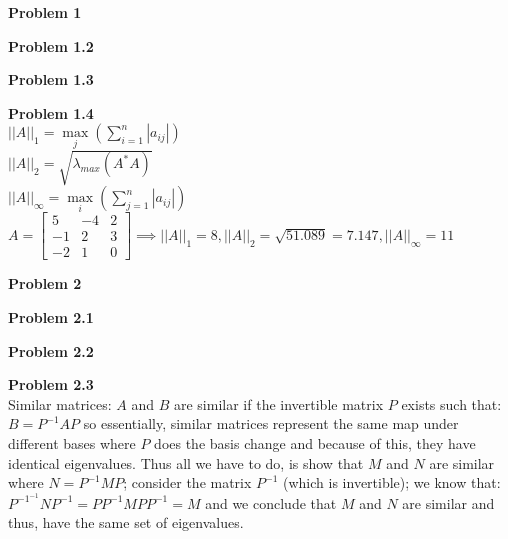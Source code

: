 \documentclass{article}
\newenvironment{problem}[2][Problem]
    { \begin{mdframed}[backgroundcolor=gray!20] \textbf{#1 #2} \\}
    {  \end{mdframed}}
\begin{document}
\begin{problem}{1}
\begin{problem}{1.2}
\begin{section}{}
            \end{section}

        \end{problem}

        \begin{problem}{1.3}
            
        \end{problem}

        \begin{problem}{1.4}
            $||A||_1 = \underset{j}{\max}(\displaystyle\sum_{i=1}^n|a_{ij}|)$\\
            $||A||_2 = \sqrt{\lambda_{max}(A^*A)}$\\
            $||A||_\infty = \underset{i}{\max}(\displaystyle\sum_{j=1}^n|a_{ij}|)$\\
            $A = \begin{bmatrix} 5&-4&2\\-1&2&3\\-2&1&0\end{bmatrix}\implies ||A||_1=8 , ||A||_2=\sqrt{51.089}=7.147 , ||A||_\infty=11$
        \end{problem}
    \end{problem} 

    \begin{problem}{2}
        \begin{problem}{2.1}

        \end{problem}

        \begin{problem}{2.2}

        \end{problem}

        \begin{problem}{2.3}
            Similar matrices: $A$ and $B$ are similar if the invertible matrix $P$ exists such that:
            $B=P^{-1}AP$ so essentially, similar matrices represent the same map under different bases where $P$ does the basis change and
            because of this, they have identical eigenvalues. Thus all we have to do, is show that $M$ and $N$ are similar where $N=P^{-1}MP$;
            consider the matrix $P^{-1}$ (which is invertible); we know that: $P^{{-1}^{-1}}NP^{-1} = PP^{-1}MPP^{-1} = M$ and we conclude that
            $M$ and $N$ are similar and thus, have the same set of eigenvalues. 
        \end{problem}
    \end{problem}

    
\end{document}
